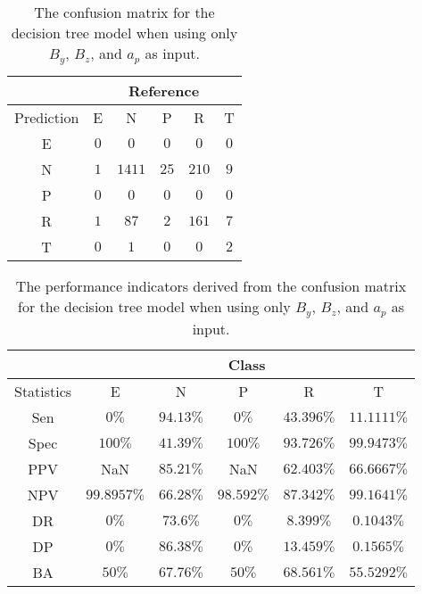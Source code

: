 \begin{table}[!ht]
	\centering
	\begin{tabular}{|c|c|c|c|c|c|}
		\hline
		 & \multicolumn{5}{|c|}{Reference} \\ \hline
		 Prediction & E & N & P & R & T \\ \hline
		 E & $0$ & $0$ & $0$ & $0$ & $0$ \\ \hline
		 N & $1$ & $1411$ & $25$ & $210$ & $9$ \\ \hline
		 P & $0$ & $0$ & $0$ & $0$ & $0$ \\ \hline
		 R & $1$ & $87$ & $2$ & $161$ & $7$ \\ \hline
		 T & $0$ & $1$ & $0$ & $0$ & $2$ \\ \hline
	\end{tabular}
	\caption{The confusion matrix for the decision tree model when using only $B_{y}$, $B_{z}$, and $a_{p}$ as input.}
	\label{tab:cm:yzap:C5.0}
\end{table}

\begin{table}[!ht]
	\centering
	\begin{tabular}{|c|c|c|c|c|c|}
		\hline
		 & \multicolumn{5}{c|}{Class} \\ \hline
		Statistics & E & N & P & R & T \\ \hline
		Sen & $0\%$ & $94.13\%$ & $0\%$ & $43.396\%$ & $11.1111\%$ \\ \hline
		Spec & $100\%$ & $41.39\%$ & $100\%$ & $93.726\%$ & $99.9473\%$ \\ \hline
		PPV & NaN & $85.21\%$ & NaN & $62.403\%$ & $66.6667\%$ \\ \hline
		NPV & $99.8957\%$ & $66.28\%$ & $98.592\%$ & $87.342\%$ & $99.1641\%$ \\ \hline
		DR & $0\%$ & $73.6\%$ & $0\%$ & $8.399\%$ & $0.1043\%$ \\ \hline
		DP & $0\%$ & $86.38\%$ & $0\%$ & $13.459\%$ & $0.1565\%$ \\ \hline
		BA & $50\%$ & $67.76\%$ & $50\%$ & $68.561\%$ & $55.5292\%$ \\ \hline
	\end{tabular}
	\caption{The performance indicators derived from the confusion matrix for the decision tree model when using only $B_{y}$, $B_{z}$, and $a_{p}$ as input.}
	\label{tab:cs:reverse:yzap:C5.0}
\end{table}
